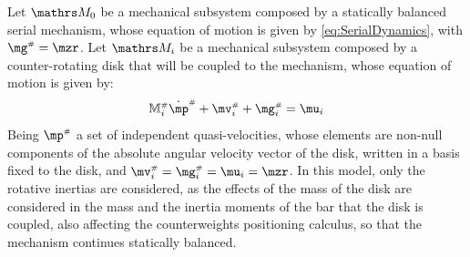 \documentclass[a4paper,11pt,brazil,fleqn]{article}
\begin{document}
Let $\ssM_0$ be a mechanical subsystem composed by a statically balanced serial mechanism, whose equation of motion is given by \eqref{eq:SerialDynamics}, with $\mg\ssh = \mzr$. Let $\ssM_i$ be a mechanical subsystem composed by a counter-rotating disk that will be coupled to the mechanism, whose equation of motion is given by:
\begin{equation}\label{eq:DiscDynamics}
\mM\ssh_i \dot{\mp}\ssh + \mv\ssh_i + \mg\ssh_i = \mu_i
\end{equation}
Being $\mp\ssh$ a set of independent quasi-velocities, whose elements are non-null components of the absolute angular velocity vector of the disk, written in a basis fixed to the disk, and $\mv\ssh_i = \mg\ssh_i = \mu_i = \mzr$. In this model, only the rotative inertias are considered, as the effects of the mass of the disk are considered in the mass and the inertia moments of the bar that the disk is coupled, also affecting the counterweights positioning calculus, so that the mechanism continues statically balanced.
\end{document}
